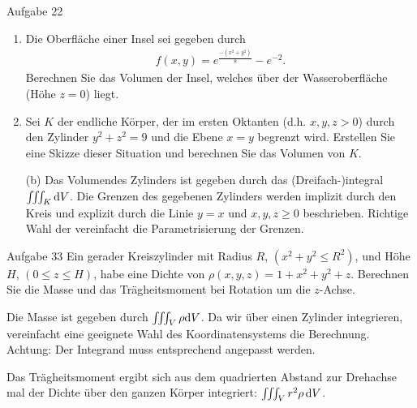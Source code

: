 \documentclass[12pt]{article}
\begin{document}
\begin{nexercise}{Aufgabe 2}{2}
    \begin{enumerate}[label=(\alph*)]
        \item Die Oberfläche einer Insel sei gegeben durch
              \begin{align}
                  f(x,y)=e^{\frac{-(x^2+y^2)}{8}}-e^{-2}.
              \end{align}
              Berechnen Sie das Volumen der Insel, welches über der Wasseroberfläche (Höhe $z=0$) liegt.

        \item Sei $K$ der endliche Körper, der im ersten Oktanten (d.h. $x,y,z>0$) durch den
              Zylinder $y^2+z^2=9$ und die Ebene $x=y$ begrenzt wird. Erstellen Sie eine
              Skizze dieser Situation und berechnen Sie das Volumen von $K$.
    \end{enumerate}
\end{nexercise}

\begin{tips}{2}
    \begin{enumerate}
        \item[(b)] Das Volumendes Zylinders ist gegeben durch das (Dreifach-)integral $\iiint_K \mathrm{d}V$. Die Grenzen des gegebenen Zylinders werden implizit durch den Kreis und explizit durch die Linie $y=x$ und $x,y,z\geq0$ beschrieben. Richtige Wahl der  vereinfacht die Parametrisierung der Grenzen.
    \end{enumerate}
\end{tips}\vspace*{1em}

\begin{nexercise}{Aufgabe 3}{3}
    Ein gerader Kreiszylinder mit Radius $R$, $(x^2+y^2\leq R^2)$, und Höhe $H$, $(0\leq{}z\leq{}H)$, habe eine Dichte von $\rho(x,y,z)=1+x^2+y^2+z$. Berechnen Sie die Masse und das Trägheitsmoment bei Rotation um die $z$-Achse.
\end{nexercise}

\begin{tips}{3}
    Die Masse ist gegeben durch $\iiint_V \rho \mathrm{d}V$. Da wir über einen Zylinder integrieren, vereinfacht eine geeignete Wahl des Koordinatensystems die Berechnung. Achtung: Der Integrand muss entsprechend angepasst werden.

    Das Trägheitsmoment ergibt sich aus dem quadrierten Abstand zur Drehachse mal der Dichte über den ganzen Körper integriert: $\iiint_V r^2 \rho\,\mathrm{d}V$.
\end{tips}
\end{document}
